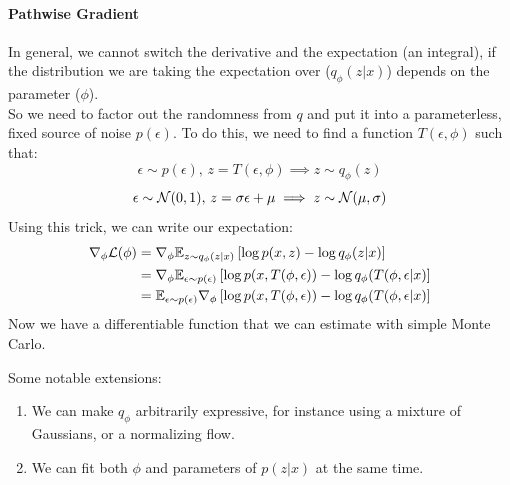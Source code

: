 \documentclass[11pt]{article}
\begin{document}
\paragraph{Pathwise Gradient}
In general, we cannot switch the derivative and the expectation (an integral), if the distribution we are taking the expectation over ($q_\phi(z|x)$) depends on the parameter ($\phi$). \\
So we need to factor out the randomness from $q$ and put it into a parameterless, fixed source of noise $p(\epsilon)$. To do this, we need to find a function $T(\epsilon, \phi)$ such that:
$$\epsilon \sim p(\epsilon), \, z = T(\epsilon, \phi) \implies z \sim q_\phi(z)$$
\remark
{}
\example
$$\epsilon \sim \mathcal{N}(0,1),\,z = \sigma \epsilon + \mu \implies z \sim \mathcal{N}(\mu, \sigma)$$
Using this trick, we can write our expectation:
\begin{align*}
	\nabla_\phi \mathcal{L}(\phi) &= \nabla_\phi \mathbb{E}_{z \sim q_\phi(z|x)}\left[ \log p(x,z) - \log q_\phi (z|x)\right] \\
	&= \nabla_\phi \mathbb{E}_{\epsilon \sim p(\epsilon)} \left[ \log p(x, T(\phi, \epsilon)) - \log q_\phi (T(\phi, \epsilon |x)\right]\\
	&= \mathbb{E}_{\epsilon \sim p(\epsilon)} \nabla_\phi \left[ \log p(x, T(\phi, \epsilon)) - \log q_\phi (T(\phi, \epsilon |x)\right]
\end{align*}
Now we have a differentiable function that we can estimate with simple Monte Carlo. 

\remark
Some notable extensions:
\begin{enumerate}
	\item We can make $q_\phi$ arbitrarily expressive, for instance using a mixture of Gaussians, or a normalizing flow.
	\item We can fit both $\phi$ and parameters of $p(z|x)$ at the same time.
\end{enumerate}
\end{document}
